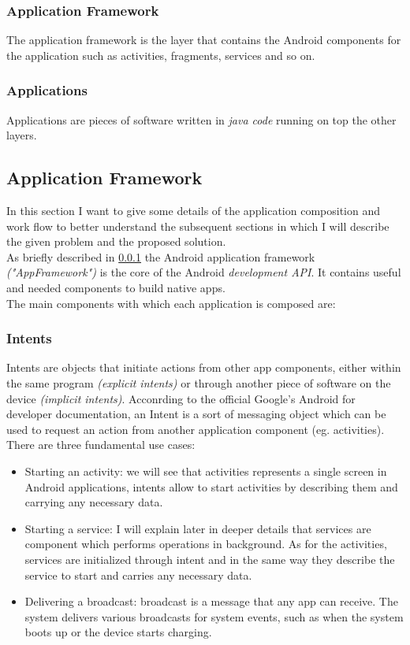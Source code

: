 \subsubsection{Application Framework}\label{appframework}
The application framework is the layer that contains the Android components for the application such as activities, fragments, services and so on. 
\subsubsection{Applications}
Applications are pieces of software written in \textit{java code} running on top the other layers.

\subsection{Application Framework}
In this section I want to give some details of the application composition and work flow to better understand the subsequent sections in which I will describe the given problem and the proposed solution.\\
As briefly described in \ref{appframework} the Android application framework \textit{("AppFramework")} is the core of the Android \textit{development API}. It contains useful and needed components to build native apps.\\
The main components with which each application is composed are:

\subsubsection{Intents}\label{intents} Intents are objects that initiate actions from other app components, either within the same program \textit{(explicit intents)} or through another piece of software on the device \textit{(implicit intents)}.
Acconrding to the official Google's Android for developer documentation, an Intent is a sort of messaging object which can be used to request an action from another application component (eg. activities). There are three fundamental use cases:
\begin{itemize}
	\item Starting an activity: we will see that activities represents a single screen in Android applications, intents allow to start activities by describing them and carrying any necessary data.
	\item Starting a service: I will explain later in deeper details that services are component which performs operations in background. As for the activities, services are initialized through intent and in the same way they describe the service to start and carries any necessary data.
	\item Delivering a broadcast: broadcast is a message that any app can receive. The system delivers various broadcasts for system events, such as when the system boots up or the device starts charging.
\end{itemize}

